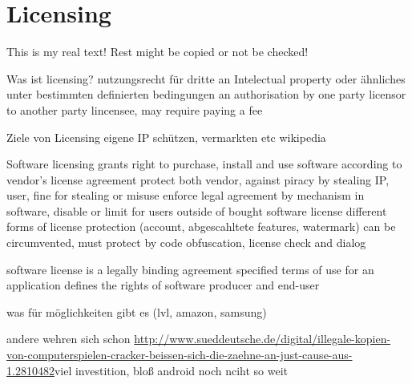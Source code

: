 \section{Licensing} \label{section:introduction-licensing}
This is my real text! Rest might be copied or not be checked!


%
Was ist licensing?
nutzungsrecht für dritte an Intelectual property oder ähnliches unter bestimmten definierten bedingungen
an authorisation by one party licensor to another party lincensee, may require paying a fee

Ziele von Licensing
eigene IP schützen, vermarkten etc
wikipedia
%

%
Software licensing grants right to purchase, install and use software according to vendor's license agreement
protect both vendor, against piracy by stealing IP, user, fine for stealing or misuse
enforce legal agreement by mechanism in software, disable or limit for users outside of bought software license
different forms of license protection (account, abgescahltete features, watermark)
can be circumvented, must protect by code obfuscation, license check and dialog
\cite{munteanLicense}
%

%
software license is a legally binding agreement
specified terms of use for an application
defines the rights of software producer and end-user
\cite{uncgLicensing}
%




was für möglichkeiten gibt es (lvl, amazon, samsung)\newline

andere wehren sich schon \url{http://www.sueddeutsche.de/digital/illegale-kopien-von-computerspielen-cracker-beissen-sich-die-zaehne-an-just-cause-aus-1.2810482}viel investition, bloß android noch nciht so weit
